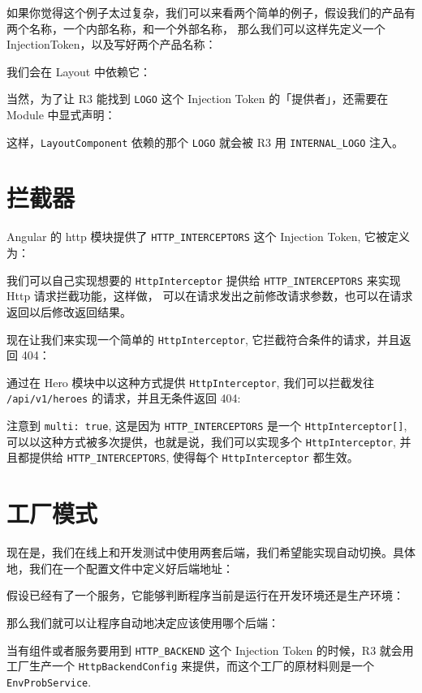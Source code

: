 \documentclass{ctexart}
\begin{document}
    

    如果你觉得这个例子太过复杂，我们可以来看两个简单的例子，假设我们的产品有两个名称，一个内部名称，和一个外部名称，
    那么我们可以这样先定义一个 InjectionToken，以及写好两个产品名称：

    

    我们会在 Layout 中依赖它：

    

    当然，为了让 R3 能找到 \verb`LOGO` 这个 Injection Token 的「提供者」，还需要在 Module 中显式声明：

    

    这样，\verb`LayoutComponent` 依赖的那个 \verb`LOGO` 就会被 R3 用 \verb`INTERNAL_LOGO` 注入。

    \section{拦截器}

    Angular 的 http 模块提供了 \verb`HTTP_INTERCEPTORS` 这个 Injection Token, 它被定义为：

    

    我们可以自己实现想要的 \verb`HttpInterceptor` 提供给 \verb`HTTP_INTERCEPTORS` 来实现 Http 请求拦截功能，这样做，
    可以在请求发出之前修改请求参数，也可以在请求返回以后修改返回结果。

    现在让我们来实现一个简单的 \verb`HttpInterceptor`, 它拦截符合条件的请求，并且返回 404：

    

    通过在 Hero 模块中以这种方式提供 \verb`HttpInterceptor`, 我们可以拦截发往 \verb`/api/v1/heroes` 的请求，并且无条件返回 404:

    

    注意到 \verb`multi: true`, 这是因为 \verb`HTTP_INTERCEPTORS` 是一个 \verb`HttpInterceptor[]`, 可以以这种方式被多次提供，也就是说，我们可以实现多个 \verb`HttpInterceptor`, 并且都提供给 \verb`HTTP_INTERCEPTORS`, 使得每个 \verb`HttpInterceptor` 都生效。

    \section{工厂模式}

    现在是，我们在线上和开发测试中使用两套后端，我们希望能实现自动切换。具体地，我们在一个配置文件中定义好后端地址：

    

    假设已经有了一个服务，它能够判断程序当前是运行在开发环境还是生产环境：

    

    那么我们就可以让程序自动地决定应该使用哪个后端：

    

    当有组件或者服务要用到 \verb`HTTP_BACKEND` 这个 Injection Token 的时候，R3 就会用工厂生产一个 \verb`HttpBackendConfig` 来提供，而这个工厂的原材料则是一个 \verb`EnvProbService`.
\end{document}
